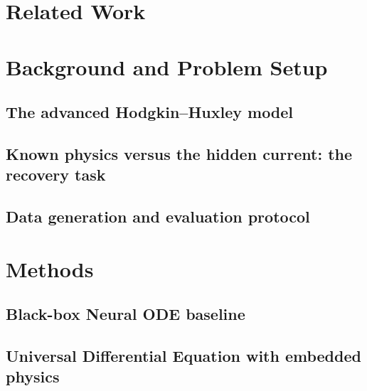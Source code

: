 \documentclass{article}
\begin{document}
\section{Related Work}
\label{sec:related}

\section{Background and Problem Setup}
\label{sec:setup}

\subsection{The advanced Hodgkin--Huxley model}

\subsection{Known physics versus the hidden current: the recovery task}

\subsection{Data generation and evaluation protocol}

\section{Methods}
\label{sec:methods}

\subsection{Black-box Neural ODE baseline}

\subsection{Universal Differential Equation with embedded physics}
\end{document}

